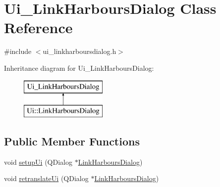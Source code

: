 \hypertarget{class_ui___link_harbours_dialog}{}\section{Ui\+\_\+\+Link\+Harbours\+Dialog Class Reference}
\label{class_ui___link_harbours_dialog}


{\ttfamily \#include $<$ui\+\_\+linkharboursdialog.\+h$>$}

Inheritance diagram for Ui\+\_\+\+Link\+Harbours\+Dialog\+:\begin{figure}[H]
\begin{center}
\leavevmode
\includegraphics[height=2.000000cm]{d7/d0c/class_ui___link_harbours_dialog}
\end{center}
\end{figure}
\subsection*{Public Member Functions}
\begin{DoxyCompactItemize}
\item 
void \mbox{\hyperlink{class_ui___link_harbours_dialog_a998ee1d1636dde43bf00b5e8c19a7c1a}{setup\+Ui}} (Q\+Dialog $\ast$\mbox{\hyperlink{class_link_harbours_dialog}{Link\+Harbours\+Dialog}})
\item 
void \mbox{\hyperlink{class_ui___link_harbours_dialog_a96bec6c00478178f58caf17db05a308c}{retranslate\+Ui}} (Q\+Dialog $\ast$\mbox{\hyperlink{class_link_harbours_dialog}{Link\+Harbours\+Dialog}})
\end{DoxyCompactItemize}
